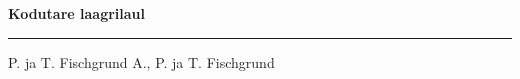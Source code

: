 \documentclass[10pt]{book}
\begin{document}
{
  \samepage
  \raggedbottom
  \raggedright
  \sloppy


  \vspace{0.2in}

  \noindent\begin{minipage}{.1\textwidth}
    \hfill\vspace{0.1in}
  \end{minipage}%
  \noindent\begin{minipage}{.8\textwidth}
    \centering
    \bfseries
    \large Kodutare laagrilaul
  \end{minipage}%
  \noindent\begin{minipage}{.1\textwidth}
      \hfill\vspace{0.1in}
  \end{minipage}

  \nopagebreak[4]
  \vspace{0.1in}
  \nopagebreak[4]
  \hrule height 0.05ex
  \nopagebreak[4]
  \vspace{-0.05in}

  {\footnotesize P. ja T. Fischgrund \hfill A., P. ja T. Fischgrund }\\
  \vspace{0.01in}



}
\end{document}
